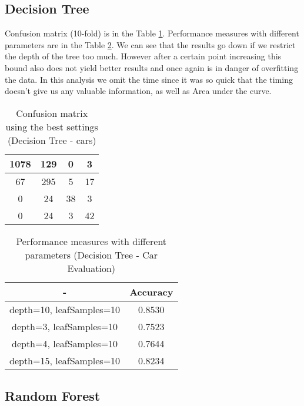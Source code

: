\documentclass[11pt,a4paper,titlepage]{article}
\begin{document}
\subsection{Decision Tree}
Confusion matrix (10-fold) is in the Table \ref{table:confusionMatrixDTcars}. Performance measures with different parameters are in the Table \ref{table:DTCarEvaln}. We can see that the results go down if we restrict the depth of the tree too much. However after a certain point increasing this bound also does not yield better results and once again is in danger of overfitting the data. In this analysis we omit the time since it was so quick that the timing doesn't give us any valuable information, as well as Area under the curve.

\begin{table}
  \centering
  \begin{tabular}{| c | c | c | c |}
    \hline
   	    1078  & 129  &   0  &  3 \\ \hline
          67  & 295 &   5  &  17 \\ \hline
          0  &  24  &  38   &  3 \\ \hline
          0  &  24  &  3   & 42 \\
    \hline
  \end{tabular}
  \caption{Confusion matrix using the best settings (Decision Tree - cars)}
  \label{table:confusionMatrixDTcars}
  \end{table}
  
  \begin{table}
  \centering
  \begin{tabular}{| c | c |}
    \hline
     		-	   & Accuracy  	 \\ \hline
    depth=10, leafSamples=10 &  0.8530 	  	\\ \hline
    depth=3, leafSamples=10 & 	0.7523	   		\\ \hline
    depth=4, leafSamples=10 & 	 0.7644	  		\\ \hline
    depth=15, leafSamples=10 &   0.8234       	\\
    \hline
  \end{tabular}
  \caption{Performance measures with different parameters (Decision Tree - Car Evaluation)}
  \label{table:DTCarEvaln}
  \end{table}

\subsection{Random Forest}
\end{document}
